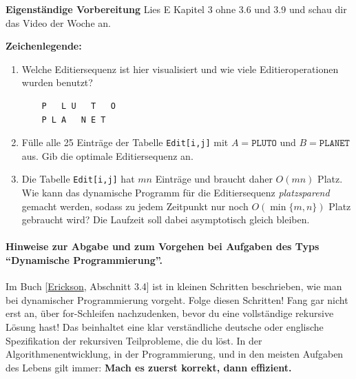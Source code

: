 \documentclass{uebung_cs}
\begin{document}
\textbf{Eigenständige Vorbereitung}
Lies  E Kapitel 3 ohne 3.6 und 3.9 und schau dir das  Video der Woche an.

\textbf{Zeichenlegende:}
\legende{}


\begin{aufgabe}[Editieren]\mbox{}
    \begin{enumerate}
        \item\bestehen Welche Editiersequenz ist hier visualisiert und wie viele Editieroperationen wurden benutzt?
\begin{verbatim}
    P   L U   T   O
    P L A   N E T
\end{verbatim}
        \item\bestehen Fülle alle 25 Einträge der Tabelle \texttt{Edit[i,j]} mit $A=\texttt{PLUTO}$ und $B=\texttt{PLANET}$ aus. Gib die optimale Editiersequenz an.
        \item\mittel Die Tabelle \texttt{Edit[i,j]} hat $mn$ Einträge und braucht daher $O(mn)$ Platz. Wie kann das dynamische Programm für die Editiersequenz \emph{platzsparend} gemacht werden, sodass zu jedem Zeitpunkt nur noch ${O(\min\{m,n\})}$ Platz gebraucht wird? Die Laufzeit soll dabei asymptotisch gleich bleiben.
    \end{enumerate}
\end{aufgabe}

\paragraph{Hinweise zur Abgabe und zum Vorgehen bei Aufgaben des Typs \enquote{Dynamische Programmierung}.}
Im Buch [\href{https://jeffe.cs.illinois.edu/teaching/algorithms/book/Algorithms-JeffE.pdf}{Erickson}, Abschnitt 3.4] ist in kleinen Schritten beschrieben, wie man bei dynamischer Programmierung vorgeht.
Folge diesen Schritten!
Fang gar nicht erst an, über for-Schleifen nachzudenken, bevor du eine vollständige rekursive Lösung hast! Das beinhaltet eine klar verständliche deutsche oder englische Spezifikation der rekursiven Teilprobleme, die du löst.
In der Algorithmenentwicklung, in der Programmierung, und in den meisten Aufgaben des Lebens gilt immer: \textbf{Mach es zuerst korrekt, dann effizient.}
\end{document}
